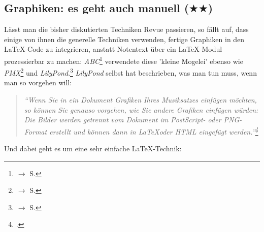 %
%
%


\subsection{Graphiken: es geht auch manuell ($\bigstar\bigstar$)}
\label{IncludeGraphics}

Lässt man die bisher diskutierten Techniken Revue passieren, so fällt auf, dass
einige von ihnen die generelle Techniken verwenden, fertige Graphiken in den
\LaTeX-Code zu integrieren, anstatt Notentext über ein \LaTeX-Modul prozessierbar
zu machen: \textit{ABC}\footnote{$\rightarrow$ S. \pageref{AbcGraphics}}
verwendete diese 'kleine Mogelei' ebenso wie \textit{PMX}\footnote{$\rightarrow$
S. \pageref{PmxGraphics}} und \textit{LilyPond}.\footnote{$\rightarrow$ S.
\pageref{LilyPondGraphics}} \textit{LilyPond} selbst hat beschrieben, was man tun
muss, wenn man so vorgehen will:

\begin{quote}\textit{\enquote{Wenn Sie in ein Dokument Grafiken Ihres
Musiksatzes einfügen möchten, so können Sie genauso vorgehen, wie Sie andere
Grafiken einfügen würden: Die Bilder werden getrennt vom Dokument im PostScript-
oder PNG-Format erstellt und können dann in \LaTeX oder HTML eingefügt
werden.}\footcite[vgl.][20]{LilyPond2018e} }\end{quote}

Und dabei geht es um eine sehr einfache \LaTeX-Technik:

